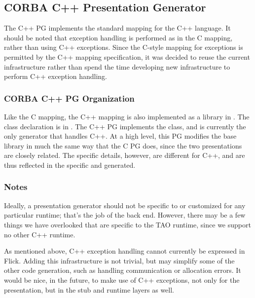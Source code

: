 \subsection{CORBA C++ Presentation Generator}
\label{subsec:PG:CORBA C++ Presentation Generator}

The \CORBA{} C++ PG implements the standard \CORBA{} mapping for the C++
language.  It should be noted that exception handling is performed as in the
\CORBA{} C mapping, rather than using C++ exceptions.  Since the C-style
mapping for \CORBA{} exceptions is permitted by the \CORBA{} C++ mapping
specification, it was decided to reuse the current infrastructure rather than
spend the time developing new infrastructure to perform C++ exception handling.

\subsubsection{CORBA C++ PG Organization}

Like the \CORBA{} C mapping, the C++ mapping is also implemented as a library
in .  The class declaration is in
.  The \CORBA{} C++ PG implements the
 class, and is currently the only generator that handles C++.
At a high level, this PG modifies the base library in much the same way that
the \CORBA{} C PG does, since the two presentations are closely related.  The
specific details, however, are different for C++, and are thus reflected in the
specific \CAST{} and \PRESC{} generated.

\subsubsection{Notes}

Ideally, a presentation generator should not be specific to or customized for
any particular runtime; that's the job of the back end.  However, there may be
a few things we have overlooked that are specific to the TAO runtime, since we
support no other C++ runtime.

As mentioned above, C++ exception handling cannot currently be expressed in
Flick.  Adding this infrastructure is not trivial, but may simplify some of the
other code generation, such as handling communication or allocation errors.  It
would be nice, in the future, to make use of C++ exceptions, not only for the
presentation, but in the stub and runtime layers as well.


